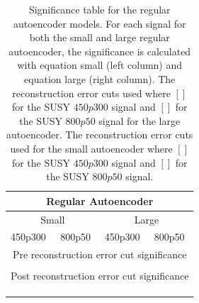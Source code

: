 \begin{table}[H]
    \centering
    \caption[Significance table regular autoencoder | 3lep]{Significance table for the regular autoencoder models. For each signal for both the small and 
    large regular autoencoder, the significance is calculated with equation small (left column) and equation large (right column). The 
    reconstruction error cuts used where $[]$ for the SUSY $450p300$ signal and $[]$ for the SUSY 
    $800p50$ signal for the large autoencoder. The reconstruction error cuts used for the small autoencoder where $[]$ 
    for the SUSY $450p300$ signal and $[]$ for the SUSY $800p50$ signal. }
    \label{tab:AE_3lep_significance}
    \begin{tabular}{|llllllll|}
    \hline
    \multicolumn{8}{|c|}{Regular Autoencoder}                                                                                                                                    \\ \hline
    \multicolumn{4}{|c|}{Small}                                                                    & \multicolumn{4}{c|}{Large}                                                  \\ \hline
    \multicolumn{2}{|l|}{450p300}                  & \multicolumn{2}{l|}{800p50}                   & \multicolumn{2}{l|}{450p300}                  & \multicolumn{2}{l|}{800p50} \\ \hline
    \multicolumn{8}{|c|}{Pre reconstruction error cut significance}                                                                                                                           \\ \hline
    \multicolumn{1}{|l|}{} & \multicolumn{1}{l|}{} & \multicolumn{1}{l|}{} & \multicolumn{1}{l|}{} & \multicolumn{1}{l|}{} & \multicolumn{1}{l|}{} & \multicolumn{1}{l|}{}  & \multicolumn{1}{l|}{} \\ \hline
    \multicolumn{8}{|c|}{Post reconstruction error  cut significance}                                                                                                                         \\ \hline
    \multicolumn{1}{|l|}{} & \multicolumn{1}{l|}{} & \multicolumn{1}{l|}{} & \multicolumn{1}{l|}{} & \multicolumn{1}{l|}{} & \multicolumn{1}{l|}{} & \multicolumn{1}{l|}{}   & \multicolumn{1}{l|}{}  \\ \hline
    \multicolumn{1}{|l|}{} & \multicolumn{1}{l|}{} & \multicolumn{1}{l|}{} & \multicolumn{1}{l|}{} & \multicolumn{1}{l|}{} & \multicolumn{1}{l|}{} & \multicolumn{1}{l|}{}   & \multicolumn{1}{l|}{}  \\ \hline
    \multicolumn{1}{|l|}{} & \multicolumn{1}{l|}{} & \multicolumn{1}{l|}{} & \multicolumn{1}{l|}{} & \multicolumn{1}{l|}{} & \multicolumn{1}{l|}{} & \multicolumn{1}{l|}{}   & \multicolumn{1}{l|}{} \\ \hline
    \end{tabular}
\end{table}